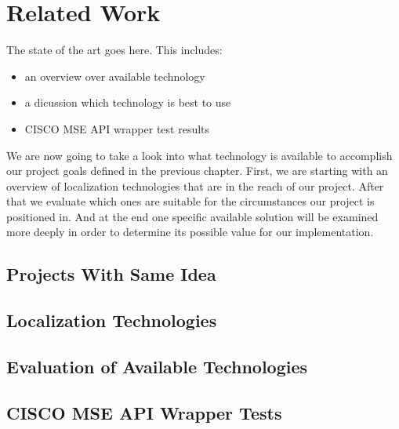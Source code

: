 \chapter{Related Work}
\label{cha:relatedwork}

The state of the art goes here. This includes:
\begin{itemize}
    \item an overview over available technology
    \item a dicussion which technology is best to use
    \item CISCO MSE API wrapper test results
\end{itemize}

\hline

\vspace{0.5cm}

We are now going to take a look into what technology is available to accomplish our project goals defined in the previous chapter. First, we are starting with an overview of localization technologies that are in the reach of our project. After that we evaluate which ones are suitable for the circumstances our project is positioned in. And at the end one specific available solution will be examined more deeply in order to determine its possible value for our implementation.

\vspace{0.5cm}

\section{Projects With Same Idea}

\vspace{0.5cm}

\section{Localization Technologies}

\vspace{0.5cm}

\section{Evaluation of Available Technologies}

\vspace{0.5cm}

\section{CISCO MSE API Wrapper Tests}

